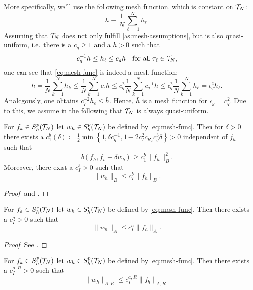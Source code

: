 \documentclass[../thesis.tex]{subfiles}
\begin{document}
More specifically, we'll use the following mesh function, which is constant on $\mathcal{T}_N$:
\begin{equation}
\label{eq:mesh-func}
	\bar{h} = \frac{1}{N} \sum_{\ell = 1}^N h_\ell.
\end{equation}
Assuming that $\mathcal{T}_N$ does not only fulfill \cref{as:mesh-assumptions}, but is also quasi-uniform, i.e.\ there is a $c_q \geq 1$ and a $h > 0$ such that
\[
	c_q^{-1} h \leq h_\ell \leq c_q h \quad \text{for all } \tau_\ell \in \mathcal{T}_N,
\]
one can see that \cref{eq:mesh-func} is indeed a mesh function:
\[
	\bar{h} = \frac{1}{N} \sum_{k = 1}^N h_k \leq \frac{1}{N} \sum_{k=1}^N c_q h \leq c_q^2 \frac{1}{N} \sum_{k=1}^N c_q^{-1} h \leq c_q^2 \frac{1}{N} \sum_{k=1}^N h_\ell = c_q^2 h_\ell.
\]
Analogously, one obtains $c_q^{-2} h_\ell \leq \bar{h}$. Hence, $\bar{h}$ is a mesh function for $c_g = c_q^2$.
Due to this, we assume in the following that $\mathcal{T}_N$ is always quasi-uniform.
\begin{lemma}
\label{thm:wh-b-bound}
For $f_h \in S_h^p(\mathcal{T}_N)$ let $w_h \in S_h^p(\mathcal{T}_N)$ be defined by \cref{eq:mesh-func}.
Then for $\delta > 0$ there exists a $c_1^b(\delta) \coloneqq \frac{1}{2} \min \left\{ 1, \delta c_g^{-1}, 1 - 2 c_I^2 c_{R_2} c_g^3 \delta \right\} > 0$ independent of $f_h$ such that
\[
	b(f_h, f_h + \delta w_h) \geq c_1^b \| f_h \|_B^2.
\]
Moreover, there exist a $c_I^b > 0$ such that
\[
	\| w_h \|_B \leq c_I^b \| f_h \|_B.
\]
\end{lemma}
\begin{proof}
\cite[Lemma 2.2.14]{Neumueller} and \cite[Lemma 2.2.15]{Neumueller}.
\end{proof}
\begin{lemma}
\label{thm:wh-A-bound}
For $f_h \in S_h^p(\mathcal{T}_N)$ let $w_h \in S_h^p(\mathcal{T}_N)$ be defined by \cref{eq:mesh-func}. Then there exists a $c_I^a > 0$ such that
\[
	\| w_h \|_A \leq c_I^a \| f_h \|_A.
\]
\end{lemma}
\begin{proof}
See \cite[Lemma 2.2.19]{Neumueller}.
\end{proof}
\begin{lemma}
\label{thm:wh-aR-bound}
For $f_h \in S_h^p(\mathcal{T}_N)$ let $w_h \in S_h^p(\mathcal{T}_N)$ be defined by \cref{eq:mesh-func}. Then there exists a $c_I^{a, R} > 0$ such that
\[
	\| w_h \|_{A, R} \leq c_I^{a, R} \| f_h \|_{A, R}.
\]
\end{lemma}
\end{document}
